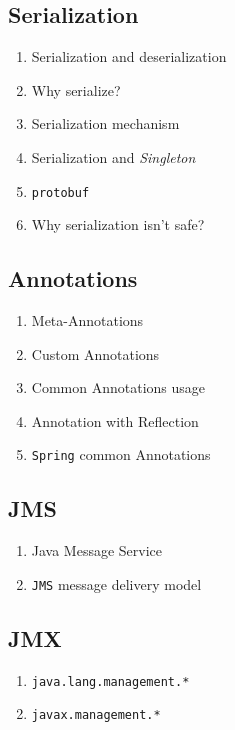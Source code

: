 \documentclass[11pt, twocolumn]{article}
\begin{document}
\subsection{Serialization}
\begin{enumerate}
	\item Serialization and deserialization
	\item Why serialize?
	\item Serialization mechanism
	\item Serialization and \textit{Singleton}
	\item \texttt{protobuf}
	\item Why serialization isn't safe?
\end{enumerate}

\subsection{Annotations}
\begin{enumerate}
	\item Meta-Annotations
	\item Custom Annotations
	\item Common Annotations usage
	\item Annotation with Reflection
	\item \texttt{Spring} common Annotations
\end{enumerate}

\subsection{JMS}
\begin{enumerate}
	\item Java Message Service
	\item \texttt{JMS} message delivery model
\end{enumerate}

\subsection{JMX}
\begin{enumerate}
	\item \texttt{java.lang.management.*}
	\item \texttt{javax.management.*}
\end{enumerate}
\end{document}
